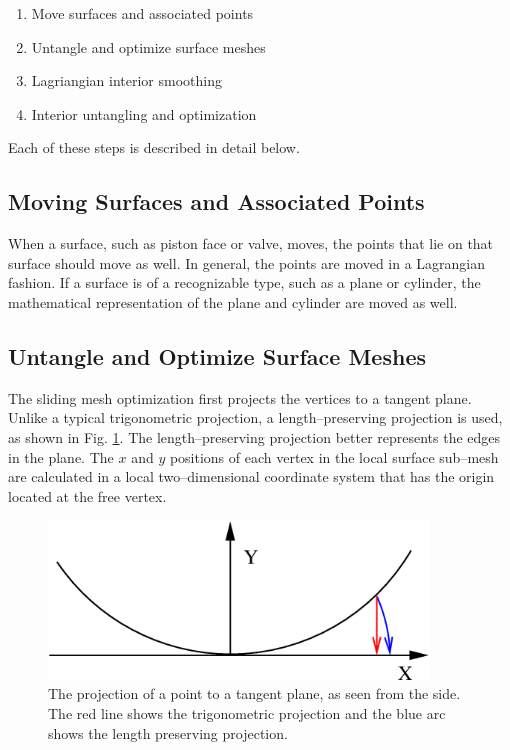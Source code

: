 \documentclass[a4paper,12pt,notitlepage]{article}
\begin{document}
\begin{enumerate}
\item Move surfaces and associated points
\item Untangle and optimize surface meshes
\item Lagriangian interior smoothing
\item Interior untangling and optimization
\end{enumerate}

Each of these steps is described in detail below.

\subsection{Moving Surfaces and Associated Points}
When a surface, such as piston face or valve, moves, the points that lie on that surface should move as well.  In general, the points are moved in a Lagrangian fashion.  If a surface is of a recognizable type, such as a plane or cylinder, the mathematical representation of the plane and cylinder are moved as well.

\subsection{Untangle and Optimize Surface Meshes}
The sliding mesh optimization first projects the vertices to a tangent
plane.  Unlike a typical trigonometric projection, a length--preserving
projection is used, as shown in Fig. \ref{fig:projection}.  The
length--preserving projection better represents the edges in the plane.
The $x$ and $y$ positions of each vertex in the local surface sub--mesh are
calculated in a local two--dimensional coordinate system that has the
origin located at the free vertex.

\begin{figure}
  \centering
  \includegraphics[width=0.9\textwidth]{Images/projection.eps}
  \caption{The projection of a point to a tangent plane, as seen from
    the side.  The red line shows the trigonometric projection and the
    blue arc shows the length preserving projection.}
  \label{fig:projection}
\end{figure}
\end{document}
